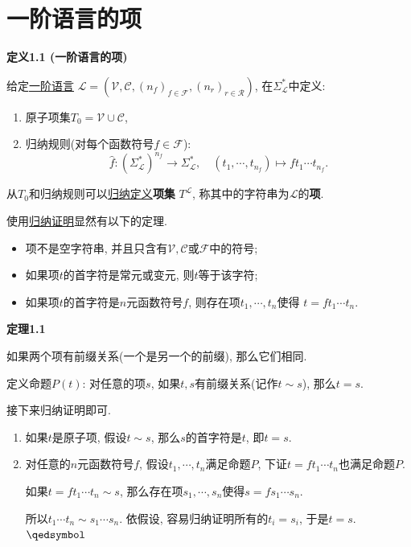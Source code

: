 


\setlength{\abovedisplayskip}{1pt}
\setlength{\belowdisplayskip}{1pt}

\section{一阶语言的项}

\hypertarget{sec:定义1.1}{}
\noindent\textbf{定义1.1 (一阶语言的项)}

给定\href{01 一阶语言#nameddest=sec:定义1.1}{一阶语言} $\mathcal{L}=
(\mathcal{V},\mathcal{C},(n_f)_{f\in\mathcal{F}},(n_r)_{r\in\mathcal{R}})$,
在$\Sigma_{\mathcal{L}}^*$中定义:
\begin{enumerate}
    \item 原子项集$T_0=\mathcal{V}\cup\mathcal{C}$,
    \item 归纳规则(对每个函数符号$f\in\mathcal{F}$):
    \[
        \hat{f}:(\Sigma_{\mathcal{L}}^*)^{n_f}\to\Sigma_{\mathcal{L}}^*,
        \quad(t_1,\cdots,t_{n_f})\mapsto ft_1\cdots t_{n_f}.
    \]
\end{enumerate}
从$T_0$和归纳规则可以\href{01 一阶语言#nameddest=sec:定义A1.1}{归纳定义}\textbf{项集}
$T^{\mathcal{L}}$, 称其中的字符串为$\mathcal{L}$的\textbf{项}.

\vspace{10pt}

使用\href{01 一阶语言#nameddest=sec:定理A1.2}{归纳证明}显然有以下的定理.
\begin{itemize}
    \item 项不是空字符串, 并且只含有$\mathcal{V},\mathcal{C}$或$\mathcal{F}$中的符号;
    \item 如果项$t$的首字符是常元或变元, 则$t$等于该字符;
    \item 如果项$t$的首字符是$n$元函数符号$f$, 则存在项$t_1,\cdots,t_n$使得
    $t=ft_1\cdots t_n$.
\end{itemize}

\vspace{10pt}

\hypertarget{sec:定理1.1}{}
\noindent\textbf{定理1.1}

如果两个项有前缀关系(一个是另一个的前缀), 那么它们相同.


定义命题$P(t)$:
对任意的项$s$, 如果$t,s$有前缀关系(记作$t\sim s$), 那么$t=s$.

接下来归纳证明即可.

\begin{enumerate}
    \item 如果$t$是原子项, 假设$t\sim s$, 那么$s$的首字符是$t$, 即$t=s$.
    \item 对任意的$n$元函数符号$f$, 假设$t_1,\cdots,t_n$满足命题$P$,
    下证$t=ft_1\cdots t_n$也满足命题$P$.
    
    \hspace{2.17em}
    如果$t=ft_1\cdots t_n\sim s$, 那么存在项$s_1,\cdots,s_n$使得$s=fs_1\cdots s_n$.

    \hspace{2.17em}
    所以$t_1\cdots t_n\sim s_1\cdots s_n$.
    依假设, 容易归纳证明所有的$t_i=s_i$, 于是$t=s$. \hfill $\qedsymbol$
\end{enumerate}


